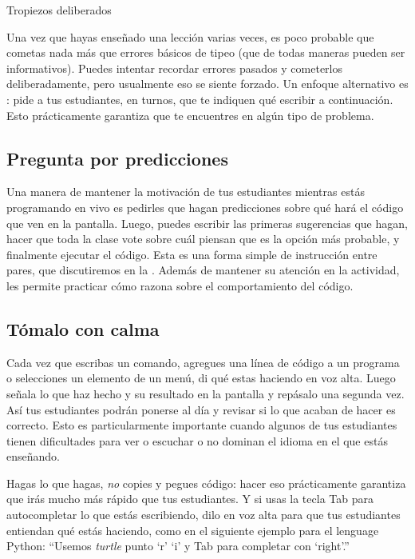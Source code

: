\begin{aside}{Tropiezos deliberados}
  
  Una vez que hayas enseñado una lección varias veces,
  es poco probable que cometas nada más que errores básicos de tipeo
  (que de todas maneras pueden ser informativos).
  Puedes intentar recordar errores pasados y cometerlos deliberadamente,
  pero usualmente eso se siente forzado.
  Un enfoque alternativo es :
  pide a tus estudiantes, en turnos, que te indiquen qué escribir a continuación.
  Esto prácticamente garantiza que te encuentres en algún tipo de problema.
\end{aside}

\subsection*{Pregunta por predicciones}

Una manera de mantener la motivación de tus estudiantes mientras estás programando en vivo
es pedirles que hagan predicciones sobre qué hará el código que ven en la pantalla.
Luego, puedes escribir las primeras sugerencias que hagan,
hacer que toda la clase vote sobre cuál piensan que es la opción más probable,
y finalmente ejecutar el código.
Esta es una forma simple de instrucción entre pares,
que discutiremos en la .
Además de mantener su atención en la actividad,
les permite practicar cómo razona sobre el comportamiento del código.

\subsection*{Tómalo con calma}

Cada vez que escribas un comando,
agregues una línea de código a un programa
o selecciones un elemento de un menú,
di qué estas haciendo en voz alta.
Luego señala lo que haz hecho y su resultado en la pantalla
y repásalo una segunda vez.
Así tus estudiantes podrán ponerse al día
y revisar si lo que acaban de hacer es correcto.
Esto es particularmente importante cuando algunos de tus estudiantes tienen dificultades para ver o escuchar o no dominan el idioma en el que estás enseñando.

Hagas lo que hagas,
\emph{no} copies y pegues código:
hacer eso prácticamente garantiza que irás mucho más rápido que tus estudiantes.
Y si usas la tecla Tab para autocompletar lo que estás escribiendo,
dilo en voz alta para que tus estudiantes entiendan qué estás haciendo, 
como en el siguiente ejemplo para el lenguage Python:
``Usemos \emph{turtle} punto `r' `i' y Tab para completar con `right'.''


